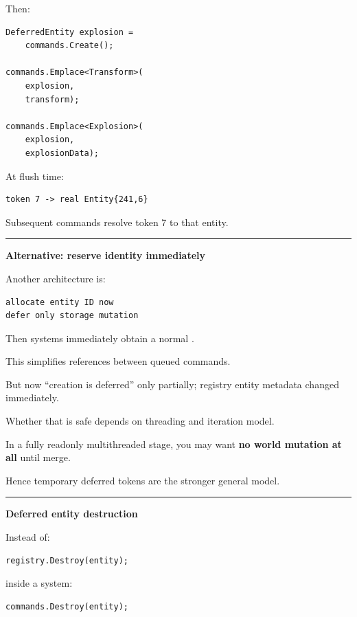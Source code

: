 Then:

\begin{verbatim}
DeferredEntity explosion =
    commands.Create();

commands.Emplace<Transform>(
    explosion,
    transform);

commands.Emplace<Explosion>(
    explosion,
    explosionData);
\end{verbatim}

At flush time:

\begin{verbatim}
token 7 -> real Entity{241,6}
\end{verbatim}

Subsequent commands resolve token 7 to that entity.

\begin{center}\rule{0.5\linewidth}{0.5pt}\end{center}

\textbf{Alternative: reserve identity immediately}

Another architecture is:

\begin{verbatim}
allocate entity ID now
defer only storage mutation
\end{verbatim}

Then systems immediately obtain a normal .

This simplifies references between queued commands.

But now ``creation is deferred'' only partially; registry entity metadata changed immediately.

Whether that is safe depends on threading and iteration model.

In a fully readonly multithreaded stage, you may want \textbf{no world mutation at all} until merge.

Hence temporary deferred tokens are the stronger general model.

\begin{center}\rule{0.5\linewidth}{0.5pt}\end{center}

\textbf{Deferred entity destruction}

Instead of:

\begin{verbatim}
registry.Destroy(entity);
\end{verbatim}

inside a system:

\begin{verbatim}
commands.Destroy(entity);
\end{verbatim}

